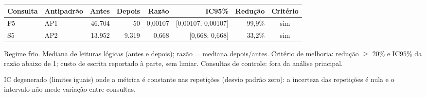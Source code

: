 {\small\setlength{\tabcolsep}{4pt}
\begin{tabular}{llrrrrrc}
\toprule
Consulta & Antipadrão & Antes & Depois & Razão & IC95\% & Redução & Critério \\
\midrule
F5 & AP1 & 46.704 & 50 & 0,00107 & [0,00107; 0,00107] & 99,9\% & sim \\
S5 & AP2 & 13.952 & 9.319 & 0,668 & [0,668; 0,668] & 33,2\% & sim \\
\bottomrule
\end{tabular}\par
\vspace{3pt}
\begin{minipage}{\linewidth}\footnotesize
Regime frio. Mediana de leituras lógicas (antes e depois); razão = mediana depois/antes. Critério de melhoria: redução $\geq$ 20\% e IC95\% da razão abaixo de 1; custo de escrita reportado à parte, sem limiar. Consultas de controle: fora da análise principal.\par
IC degenerado (limites iguais) onde a métrica é constante nas repetições (desvio padrão zero): a incerteza das repetições é nula e o intervalo não mede variação entre consultas.
\end{minipage}
}

